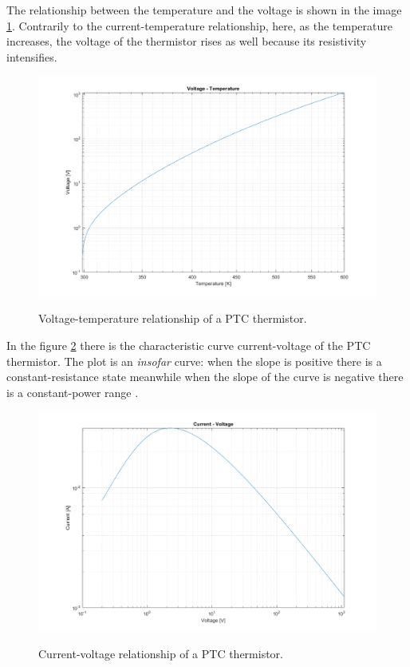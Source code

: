 \FloatBarrier \noindent The relationship between the temperature and the voltage is shown in the image \ref{fig:PTC_volt-temp}. Contrarily to the current-temperature relationship, here, as the temperature increases, the voltage of the thermistor rises as well because its resistivity intensifies.

\begin{figure}[h]
    \centering
    \includegraphics[width = .75\textwidth]{../res/plots/PTC_volt-temp.png}
    \label{fig:PTC_volt-temp}
    \caption{Voltage-temperature relationship of a PTC thermistor.}
\end{figure}

\FloatBarrier \noindent In the figure \ref{fig:PTC_curr-volt} there is the characteristic curve current-voltage of the PTC thermistor. The plot is an \textsl{insofar} curve: when the slope is positive there is a constant-resistance state meanwhile when the slope of the curve is negative there is a constant-power range \cite{Saburi196353}.

\begin{figure}[h]
    \centering
    \includegraphics[width = .75\textwidth]{../res/plots/PTC_curr-volt.png}
    \label{fig:PTC_curr-volt}
    \caption{Current-voltage relationship of a PTC thermistor.}
\end{figure}

